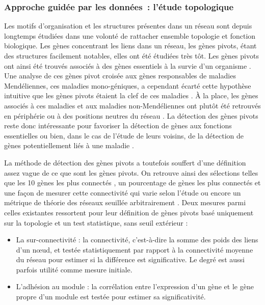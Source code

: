 \subsubsection{Approche guidée par les données : l'étude topologique}

Les motifs d'organisation et les structures présentes dans un réseau sont depuis longtemps étudiées dans une volonté de rattacher ensemble topologie et fonction biologique. Les gènes concentrant les liens dans un réseau, les gènes pivots, étant des structures facilement notables, elles ont été étudiées très tôt. Les gènes pivots ont ainsi été trouvés associés à des gènes essentiels à la survie d'un organisme \cite{Jeong2001May}. Une analyse de ces gènes pivot croisée aux gènes responsables de maladies Mendéliennes, ces maladies mono-géniques, a cependant écarté cette hypothèse intuitive que les gènes pivots étaient la clef de ces maladies \cite{Goh2007May}. À la place, les gènes associés à ces maladies et aux maladies non-Mendéliennes ont plutôt été retrouvés en périphérie ou à des positions neutres du réseau \cite{Jeong2001May}. La détection des gènes pivots reste donc intéressante pour favoriser la détection de gènes aux fonctions essentielles ou bien, dans le cas de l'étude de leurs voisins, de la détection de gènes potentiellement liés à une maladie \cite{Langfelder2013}.

La méthode de détection des gènes pivots a toutefois souffert d'une définition assez vague de ce que sont les gènes pivots. On retrouve ainsi des sélections telles que les 10 gènes les plus connectés \cite{Russo2018}, un pourcentage de gènes les plus connectés et une façon de mesurer cette connectivité qui varie selon l'étude \cite{Sundarrajan2016, Tang2018} ou encore un métrique de théorie des réseaux seuillée arbitrairement \cite{Saha2017}. Deux mesures parmi celles existantes ressortent pour leur définition de gènes pivots basé uniquement sur la topologie et un test statistique, sans seuil extérieur :
\begin{itemize}
    \item La sur-connectivité \cite{Das2017} : la connectivité, c’est-à-dire la somme des poids des liens d'un nœud, et testée statistiquement par rapport à la connectivité moyenne du réseau pour estimer si la différence est significative. Le degré est aussi parfois utilité comme mesure initiale.
    \item L'adhésion au module \cite{Horvath2008} : la corrélation entre l'expression d'un gène et le gène propre d'un module est testée pour estimer sa significativité.
\end{itemize}

